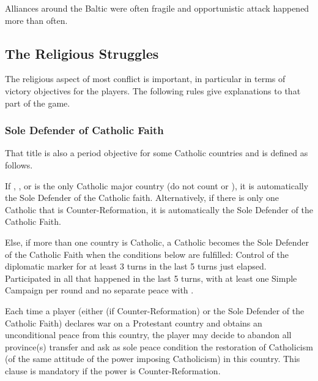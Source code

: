 \begin{designnote}
  Alliances around the Baltic were often fragile and opportunistic attack
  happened more than often.
\end{designnote}

\subsection{The Religious Struggles}

The religious aspect of most conflict is important, in particular in terms of
victory objectives for the players. The following rules give explanations to
that part of the game.


\subsubsection{Sole Defender of Catholic Faith}\label{chSpecific:Catholic
  Faith}
\aparag That title is also a period objective for some Catholic countries and
is defined as follows.

\aparag If \FRA, \SPA, \ENG or \POL is the only Catholic major country (do not
count \POR or \VEN), it is automatically the Sole Defender of the Catholic
faith.
\bparag Alternatively, if there is only one Catholic \MAJ that is
Counter-Reformation, it is automatically the Sole Defender of the Catholic
Faith.

\aparag Else, if more than one country is Catholic, a Catholic \MAJ becomes
the Sole Defender of the Catholic Faith when the conditions below are
fulfilled:
\bparag Control of the  diplomatic marker for at least 3 turns
in the last 5 turns just elapsed.
\bparag Participated in all  that happened in the last 5
turns, with at least one Simple Campaign per round and no separate peace with
\TUR.


 Each time a player
(either \SPA (if Counter-Reformation) or the Sole Defender of the Catholic
Faith) declares war on a Protestant country and obtains an unconditional peace
from this country, the player may decide to abandon all province(s) transfer
and ask as sole peace condition the restoration of Catholicism (of the same
attitude of the power imposing Catholicism) in this country.
\bparag This clause is mandatory if the power is Counter-Reformation.

